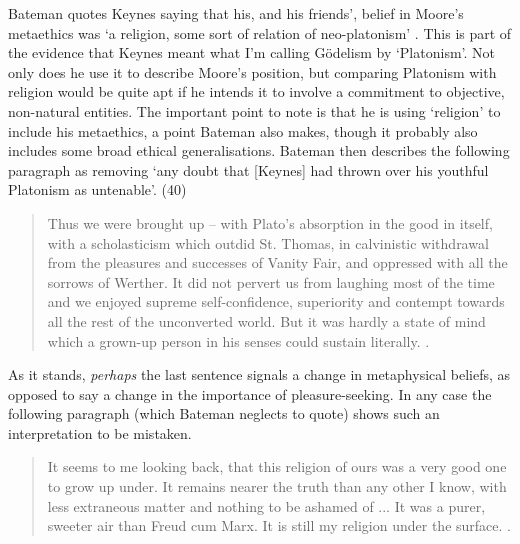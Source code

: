 Bateman quotes Keynes saying that his, and his friends', belief in Moore's metaethics was `a religion, some sort of relation of neo-platonism' \cite[438]{KeynesMEB}. This is part of the evidence that Keynes meant what I'm calling G\"{o}delism by `Platonism'. Not only does he use it to describe Moore's position, but comparing Platonism with religion would be quite apt if he intends it to involve a commitment to objective, non-natural entities. The important point to note is that he is using `religion' to include his metaethics, a point Bateman also makes, though it probably also includes some broad ethical generalisations. Bateman then describes the following paragraph as removing `any doubt that [Keynes] had thrown over his youthful Platonism as untenable'. (40)

\begin{quote}
Thus we were brought up -- with Plato's absorption in the good in itself, with a scholasticism which outdid St. Thomas, in calvinistic withdrawal from the pleasures and successes of Vanity Fair, and oppressed with all the sorrows of Werther. It did not pervert us from laughing most of the time and we enjoyed supreme self-confidence, superiority and contempt towards all the rest of the unconverted world. But it was hardly a state of mind which a grown-up person in his senses could sustain literally. \citep[442]{Keynes1938}.
\end{quote}

\noindent As it stands, \textit{perhaps }the last sentence signals a change in metaphysical beliefs, as opposed to say a change in the importance of pleasure-seeking. In any case the following paragraph (which Bateman neglects to quote) shows such an interpretation to be mistaken.

\begin{quote}
It seems to me looking back, that this religion of ours was a very good one to grow up under. It remains nearer the truth than any other I know, with less extraneous matter and nothing to be ashamed of ... It was a purer, sweeter air than Freud cum Marx. It is still my religion under the surface. \citep[442]{Keynes1938}.
\end{quote}

